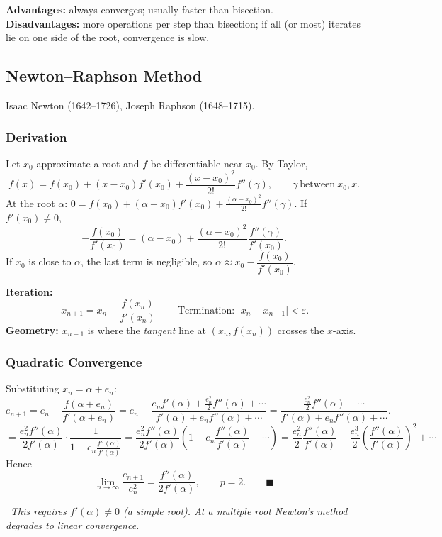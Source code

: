 \documentclass[hidelinks]{article}
\newcommand{\callout}[1]{\par\smallskip\noindent{\color{capri}$\blacktriangleright$}\ \textit{#1}\par\smallskip}
\newcommand{\abs}[1]{\left|#1\right|}
\begin{document}
\textbf{Advantages:} always converges; usually faster than bisection.\\
\textbf{Disadvantages:} more operations per step than bisection; if all (or most) iterates lie on one side of the root, convergence is slow.

\subsection{Newton--Raphson Method}

Isaac Newton (1642--1726), Joseph Raphson (1648--1715).

\subsubsection{Derivation}

Let $x_0$ approximate a root and $f$ be differentiable near $x_0$. By Taylor,
\[
f(x)=f(x_0)+(x-x_0)f'(x_0)+\frac{(x-x_0)^2}{2!}f''(\gamma),\qquad \gamma\ \text{between}\ x_0,x .
\]
At the root $\alpha$: $0=f(x_0)+(\alpha-x_0)f'(x_0)+\frac{(\alpha-x_0)^2}{2!}f''(\gamma)$. If $f'(x_0)\neq0$,
\[
-\frac{f(x_0)}{f'(x_0)}=(\alpha-x_0)+\frac{(\alpha-x_0)^2}{2!}\frac{f''(\gamma)}{f'(x_0)}.
\]
If $x_0$ is close to $\alpha$, the last term is negligible, so $\alpha\approx x_0-\dfrac{f(x_0)}{f'(x_0)}$.

\textbf{Iteration:}
\[
\boxed{\,x_{n+1}=x_n-\frac{f(x_n)}{f'(x_n)}\,}\qquad\text{Termination: }\abs{x_n-x_{n-1}}<\varepsilon .
\]
\textbf{Geometry:} $x_{n+1}$ is where the \emph{tangent} line at $(x_n,f(x_n))$ crosses the $x$-axis.

\subsubsection{Quadratic Convergence}

Substituting $x_n=\alpha+e_n$:
\[
e_{n+1}=e_n-\frac{f(\alpha+e_n)}{f'(\alpha+e_n)}
=e_n-\frac{e_nf'(\alpha)+\frac{e_n^2}{2}f''(\alpha)+\cdots}{f'(\alpha)+e_nf''(\alpha)+\cdots}
=\frac{\frac{e_n^2}{2}f''(\alpha)+\cdots}{f'(\alpha)+e_nf''(\alpha)+\cdots}.
\]
\[
=\frac{e_n^2f''(\alpha)}{2f'(\alpha)}\cdot\frac{1}{1+e_n\frac{f''(\alpha)}{f'(\alpha)}}
=\frac{e_n^2f''(\alpha)}{2f'(\alpha)}\left(1-e_n\frac{f''(\alpha)}{f'(\alpha)}+\cdots\right)
=\frac{e_n^2}{2}\frac{f''(\alpha)}{f'(\alpha)}-\frac{e_n^3}{2}\left(\frac{f''(\alpha)}{f'(\alpha)}\right)^2+\cdots
\]
Hence
\[
\lim_{n\to\infty}\frac{e_{n+1}}{e_n^2}=\frac{f''(\alpha)}{2f'(\alpha)},\qquad p=2 .\qquad\blacksquare
\]
\callout{This requires $f'(\alpha)\neq0$ (a \emph{simple} root). At a multiple root Newton's method degrades to linear convergence.}
\end{document}
